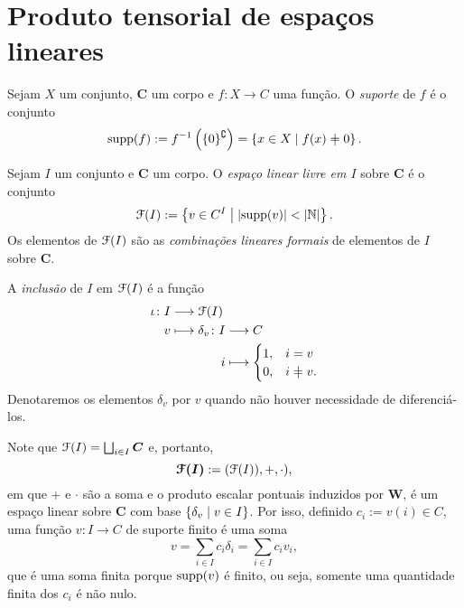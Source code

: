 \cleardoublepage





\section{Produto tensorial de espaços lineares}

\begin{definition}
Sejam $X$ um conjunto, $\bm C$ um corpo e $f: X \to C$ uma função. O \emph{suporte} de $f$ é o conjunto
	\begin{equation*}
	\supp(f) := f\inv\left(\{0\}^\complement\right) = \set{x \in X}{f(x) \neq 0}.
	\end{equation*}
\end{definition}


\begin{definition} Sejam $I$ um conjunto e $\bm C$ um corpo. O \emph{espaço linear livre em $I$} sobre $\bm C$ é o conjunto 
	\begin{equation*}
	\mathcal{F}(I) := \left\{{v \in C^I}\;\middle\vert\;{\left\lvert{\operatorname{supp}(v)}\right\rvert<\left\lvert{\mathbb{N}}\right\rvert}\right\}.
	\end{equation*}
Os elementos de $\mathcal{F}(I)$ são as \emph{combinações lineares formais} de elementos de $I$ sobre $\bm C$.

A \emph{inclusão} de $I$ em $\mathcal{F}(I)$ é a função
	\begin{align*}
	\func{\iota}{I}{\liv(I)}{v}{
		\begin{aligned}[t]
		\func{\delta_v}{I}{C}{i}{\begin{cases}
							1,& i = v \\
							0,& i \neq v.
						\end{cases}}
		\end{aligned}	
	}
	\end{align*}
Denotaremos os elementos $\delta_v$ por $v$ quando não houver necessidade de diferenciá-los.
\end{definition}

Note que $\mathcal{F}(I) = \bigsqcup_{i \in I} \bm C$ e, portanto,
	\begin{equation*}
	\bm{\mathcal{F}(I)} := (\mathcal{F}(I)),+,\cdot),
	\end{equation*}	
em que $+$ e $\cdot$ são a soma e o produto escalar pontuais induzidos por $\bm W$, é um espaço linear sobre $\bm C$ com base $\left\{{\delta_v}\;\middle\vert\;{v \in I}\right\}$. Por isso, definido $c_i := v(i) \in C$, uma função $v: I \to C$ de suporte finito é uma soma
	\begin{equation*}
	v = \sum_{i \in I} c_i \delta_i = \sum_{i \in I} c_i v_i,
	\end{equation*}
que é uma soma finita porque $\operatorname{supp}(v)$ é finito, ou seja, somente uma quantidade finita dos $c_i$ é não nulo.


